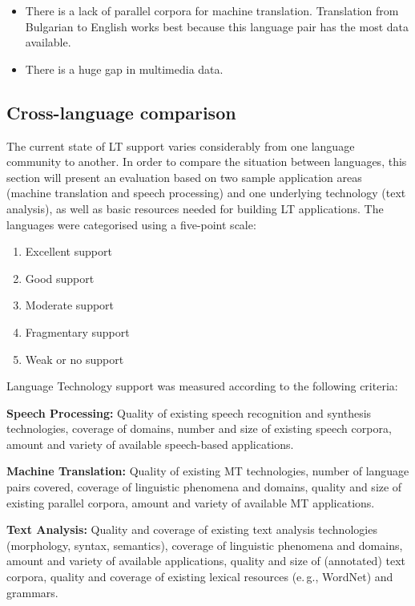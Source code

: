 \begin{multicols}{2}
\begin{itemize}
  \item There is a lack of parallel corpora for machine translation. Translation from Bulgarian to English works best because this language pair has the most data available. 

  \item There is a huge gap in multimedia data.
  \end{itemize}

  \subsection{Cross-language comparison}

  The current state of LT support varies considerably from one language community to another. In order to compare the situation between languages, this section will present an evaluation based on two sample application areas (machine translation and speech processing) and one underlying technology (text analysis), as well as basic resources needed for building LT applications. The languages were categorised using a five-point scale: 

  \begin{enumerate}
  \item Excellent support
  \item Good support
  \item Moderate support
  \item Fragmentary support
  \item Weak or no support
  \end{enumerate}

  Language Technology support was measured according to the following criteria:

  \textbf{Speech Processing:} Quality of existing speech recognition and synthesis technologies, coverage of domains, number and size of existing speech corpora, amount and variety of available speech-based applications.

  \textbf{Machine Translation:} Quality of existing MT technologies, number of language pairs covered, coverage of linguistic phenomena and domains, quality and size of existing parallel corpora, amount and variety of available MT applications.

  \textbf{Text Analysis:} Quality and coverage of existing text analysis technologies (morphology, syntax, semantics), coverage of linguistic phenomena and domains, amount and variety of available applications, quality and size of (annotated) text corpora, quality and coverage of existing lexical resources (e.\,g., WordNet) and grammars.


\end{multicols}
